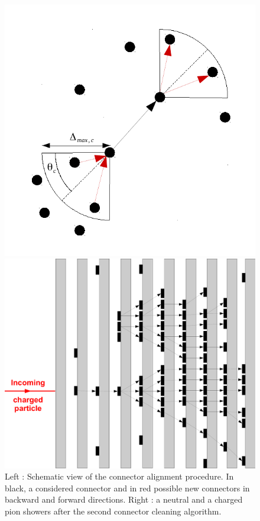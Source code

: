 \documentclass[12pt]{article}
\begin{document}
\begin{figure}[!h]
  \begin{minipage}{0.4\linewidth}
    \begin{center}
      \includegraphics[width=0.8\linewidth]{ConnectorAlignment.pdf}
    \end{center}
  \end{minipage}
  \begin{minipage}{0.58\linewidth}
    \begin{center}
      \includegraphics[width=0.8\linewidth]{ConnectorCleaning2.pdf}
    \end{center}
  \end{minipage}
  \caption{\label{ARBOR_CONNECTOR_ALIGNEMENT} \label{ARBOR_CONNECTOR_CLEANING_2} Left : Schematic view of the connector alignment procedure. In black, a considered connector and in red possible new connectors in backward and forward directions. Right : a neutral and a charged pion showers after the second connector cleaning algorithm.}
\end{figure}
\end{document}
